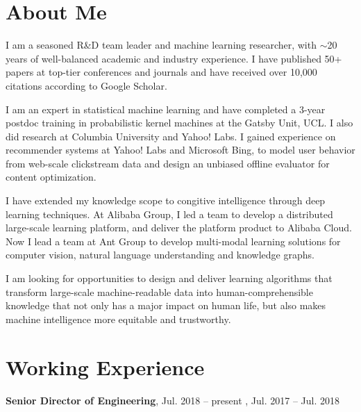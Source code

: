 \documentclass[line,10pt,final]{res}
\begin{document}
\begin{resume}
\section{\sc About Me} 
I am a seasoned R\&D team leader and machine learning researcher, with $\sim$20 years of well-balanced academic and industry experience. I have published 50+ papers at top-tier conferences and journals and have received over 10,000 citations according to Google Scholar.

I am an expert in statistical machine learning and have completed a 3-year postdoc training in probabilistic kernel machines at the Gatsby Unit, UCL. I also did research at Columbia University and Yahoo! Labs. I gained experience on recommender systems at Yahoo! Labs and Microsoft Bing, to model user behavior from web-scale clickstream data and design an unbiased offline evaluator for content optimization. 

I have extended my knowledge scope to congitive intelligence through deep learning techniques. At Alibaba Group, I led a team to develop a distributed large-scale learning platform, and deliver the platform product to Alibaba Cloud. Now I lead a team at Ant Group to develop multi-modal learning solutions for computer vision, natural language understanding and knowledge graphs. 

I am looking for opportunities to design and deliver learning algorithms that transform large-scale machine-readable data into human-comprehensible knowledge that not only has a major impact on human life, but also makes machine intelligence more equitable and trustworthy.





\section{\sc Working Experience} %

{\bf Senior Director of Engineering}, Jul. 2018 -- present  
, Jul. 2017 -- Jul. 2018  


\end{resume}
\end{document}
